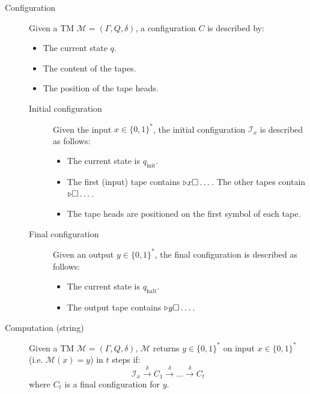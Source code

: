 \begin{description}
    \item[Configuration] 
        Given a TM $\mathcal{M} = (\Gamma, Q, \delta)$, a configuration $C$ is described by:
        \begin{itemize}
            \item The current state $q$.
            \item The content of the tapes.
            \item The position of the tape heads.
        \end{itemize}

        \begin{description}
            \item[Initial configuration] 
                Given the input $x \in \{ 0, 1 \}^*$, the initial configuration $\mathcal{I}_x$ is described as follows:
                \begin{itemize}
                    \item The current state is $q_\text{init}$.
                    \item The first (input) tape contains $\triangleright x \square \dots$.
                        The other tapes contain $\triangleright \square \dots$.
                    \item The tape heads are positioned on the first symbol of each tape.
                \end{itemize}

            \item[Final configuration] 
                Given an output $y \in \{0, 1\}^*$, the final configuration is described as follows:
                \begin{itemize}
                    \item The current state is $q_\text{halt}$.
                    \item The output tape contains $\triangleright y \square \dots$.
                \end{itemize} 
        \end{description}

    \item[Computation (string)] 
        Given a TM $\mathcal{M} = (\Gamma, Q, \delta)$, 
        $\mathcal{M}$ returns $y \in \{ 0, 1 \}^*$ on input $x \in \{ 0, 1 \}^*$ (i.e. $\mathcal{M}(x) = y$) in $t$ steps if:
        \[ \mathcal{I}_x \xrightarrow{\delta} C_1 \xrightarrow{\delta} \dots \xrightarrow{\delta} C_t \]
        where $C_t$ is a final configuration for $y$.


\end{description}
